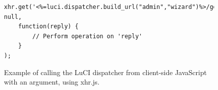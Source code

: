 \documentclass[a4paper,11pt,makeidx]{kth-bcs}
\begin{document}
   \begin{figure}[h!]
   \centering
      \lstset{language=java}
      \begin{lstlisting}
xhr.get('<%=luci.dispatcher.build_url("admin","wizard")%>/get_list/'+argument, null,
    function(reply) {
        // Perform operation on 'reply'
    }
);
      \end{lstlisting}
      \caption{
         \small{
Example of calling the LuCI dispatcher from client-side JavaScript with an argument, using xhr.js.
         }
      }
      \label{fig:javascript}
   \end{figure}




\end{document}
